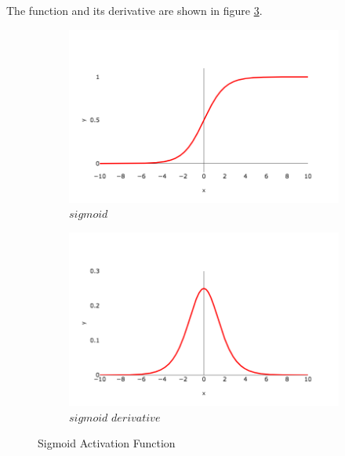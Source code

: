             \noindent The function and its derivative are shown in figure \ref{fig:sigmoid}. 
            
            \begin{figure}[H]
                \begin{subfigure}{0.5\textwidth}
                  \centering
                  \includegraphics[width=1.0\linewidth]{Images/sigmoid.png}
                  \caption{$sigmoid$}
                  \label{fig:sig}
                \end{subfigure}%
                \begin{subfigure}{0.5\textwidth}
                  \centering
                  \includegraphics[width=1.0\linewidth]{Images/dsigmoid.png}
                  \caption{$sigmoid \, \, derivative$}
                  \label{fig:sig_div}
                \end{subfigure}
                \caption{Sigmoid Activation Function}
                \label{fig:sigmoid}
            \end{figure}
            
